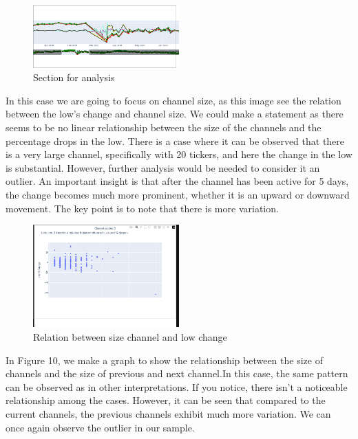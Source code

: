 \documentclass{article}
\begin{document}
\begin{figure}[h]
  \caption{Section for analysis}
  \begin{center}
    \includegraphics[width=0.5\textwidth]{figures/2023-05-25-144607_770x329_scrot.png}
  \end{center}
\end{figure}
\newpage
In this case we are going to focus on channel size, as this image see the
relation between the low's change and channel size. We could make a statement as  there seems to be no linear relationship between the size of the channels and the percentage drops in the low. There is a case where it can be observed that there is a very large channel, specifically with 20 tickers, and here the change in the low is substantial. However, further analysis would be needed to consider it an outlier. An important insight is that after the channel has been active for 5 days, the change becomes much more prominent, whether it is an upward or downward movement. The key point is to note that there is more variation.
\begin{figure}[h]
  \caption{Relation between size channel and low change}
  \begin{center}
    \includegraphics[width=0.5\textwidth]{figures/10.png}
  \end{center}
\end{figure}
In Figure 10, we make a graph to show the relationship between the size of
channels and the size of previous and next channel.In this case, the same pattern can be observed as in other interpretations. If you notice, there isn't a noticeable relationship among the cases. However, it can be seen that compared to the current channels, the previous channels exhibit much more variation. We can once again observe the outlier in our sample.
\end{document}
